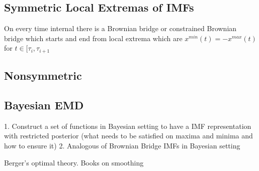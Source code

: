\documentclass[article,moreauthors,pdftex,10pt,a4paper]{ssrn}
\begin{document}
\subsection{Symmetric Local Extremas of IMFs} 
On every time internal there is a Brownian bridge or constrained Brownian bridge which starts and end from local extrema which are $x^{min} (t)= -x^{max}(t)$ for $t \in [\tau_i,\tau_{i+1}$
\subsection{Nonsymmetric}

\subsection{Bayesian EMD}
1. Construct a set of functions in Bayesian setting to have a IMF representation with restricted posterior (what needs to be satisfied on maxima and minima and how to ensure it)
2. Analogous of Brownian Bridge IMFs in Bayesian setting

Berger's optimal theory. Books on smoothing
\end{document}
